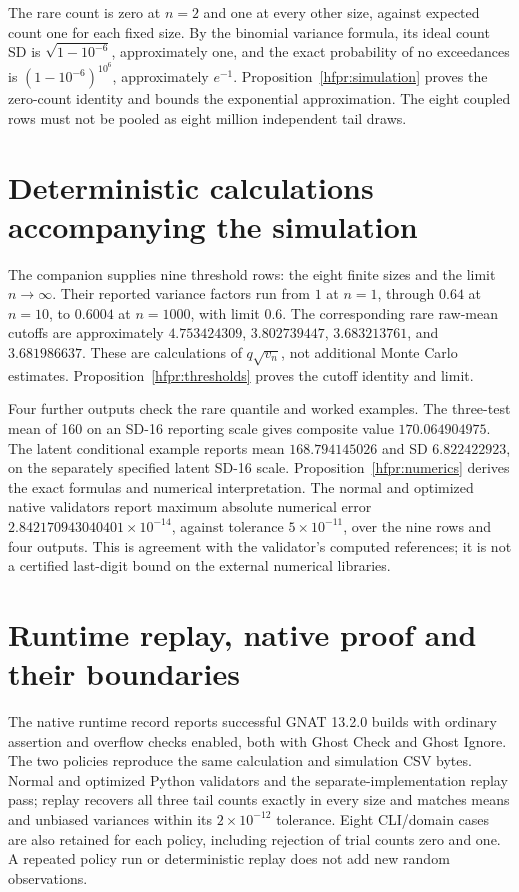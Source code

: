 The rare count is zero at \(n=2\) and one at every other size, against
expected count one for each fixed size. By the binomial variance formula,
its ideal count SD is \(\sqrt{1-10^{-6}}\), approximately one, and the
exact probability of no exceedances is \((1-10^{-6})^{10^6}\),
approximately \(e^{-1}\). Proposition~\ref{hfpr:simulation} proves the
zero-count identity and bounds the exponential approximation. The eight
coupled rows must not be pooled as eight million independent tail draws.

\section{Deterministic calculations accompanying the simulation}
\label{sec:hf-spark-calculations}
The companion  supplies nine threshold rows:
the eight finite sizes and the limit \(n\to\infty\). Their reported
variance factors run from \(1\) at \(n=1\), through \(0.64\) at
\(n=10\), to \(0.6004\) at \(n=1000\), with limit \(0.6\).
The corresponding rare raw-mean cutoffs are approximately
\(4.753424309\), \(3.802739447\), \(3.683213761\), and
\(3.681986637\). These are calculations of \(q\sqrt{v_n}\), not
additional Monte Carlo estimates. Proposition~\ref{hfpr:thresholds}
proves the cutoff identity and limit.

Four further outputs check the rare quantile and worked examples. The
three-test mean of 160 on an SD-16 reporting scale gives composite value
\(170.064904975\). The latent conditional example reports mean
\(168.794145026\) and SD \(6.822422923\), on the separately specified
latent SD-16 scale. Proposition~\ref{hfpr:numerics} derives the exact
formulas and numerical interpretation. The normal and optimized native
validators report maximum absolute numerical error
\(2.842170943040401\times10^{-14}\), against tolerance
\(5\times10^{-11}\), over the nine rows and four outputs. This is
agreement with the validator's computed references; it is not a certified
last-digit bound on the external numerical libraries.

\section{Runtime replay, native proof and their boundaries}
The native runtime record reports successful GNAT 13.2.0 builds with
ordinary assertion and overflow checks enabled, both with Ghost Check
and Ghost Ignore. The two policies reproduce the same calculation and
simulation CSV bytes. Normal and optimized Python validators and the
separate-implementation replay pass; replay recovers all three tail
counts exactly in every size and matches means and unbiased variances
within its \(2\times10^{-12}\) tolerance. Eight CLI/domain cases are
also retained for each policy, including rejection of trial counts zero
and one. A repeated policy run or deterministic replay does not add new
random observations.

